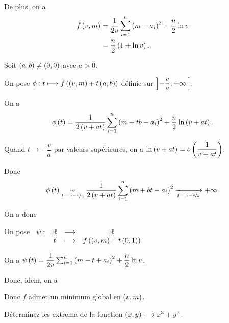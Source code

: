 \begin{corr}
De plus, on a \[\begin{aligned}
f\left(v,m\right)&=\dfrac{1}{2v}\sum_{i=1}^n\left(m-a_i\right)^2+\dfrac{n}{2}\ln v \\
&=\dfrac{n}{2}\left(1+\ln v\right).
\end{aligned}\]

Soit \(\left(a,b\right)\not=\left(0,0\right)\) avec \(a>0\).

On pose \(\phi:t\longmapsto f\left(\left(v,m\right)+t\left(a,b\right)\right)\) définie sur \(\left]-\dfrac{v}{a};+\infty\right[\).

On a \[\phi\left(t\right)=\dfrac{1}{2\left(v+at\right)}\sum_{i=1}^n\left(m+tb-a_i\right)^2+\dfrac{n}{2}\ln\left(v+at\right).\]

Quand \(t\to-\dfrac{v}{a}\) par valeurs supérieures, on a \(\ln\left(v+at\right)=o\left(\dfrac{1}{v+at}\right)\).

Donc \[\phi\left(t\right)\underset{t\longrightarrow\nicefrac{-v}{a}}{\sim}\dfrac{1}{2\left(v+at\right)}\sum_{i=1}^n\left(m+bt-a_i\right)^2\xrightarrow[t\longrightarrow\nicefrac{-v}{a}]{}+\infty.\]

On a donc \begin{center}
\end{center}

On pose \(\begin{array}[t]{cccc}\psi : & \mathbb{R} & \longrightarrow & \mathbb{R} \\ & t & \longmapsto & f\left(\left(v,m\right)+t\left(0,1\right)\right)\end{array}\)

On a \(\psi\left(t\right)=\dfrac{1}{2v}\sum_{i=1}^n\left(m-t+a_i\right)^2+\dfrac{n}{2}\ln v\).

Donc, idem, on a \begin{center}
\end{center}

Donc \(f\) admet un minimum global en \(\left(v,m\right)\).
\end{corr}

\begin{exo}
Déterminez les extrema de la fonction \(\left(x,y\right)\longmapsto x^3+y^2\).
\end{exo}

